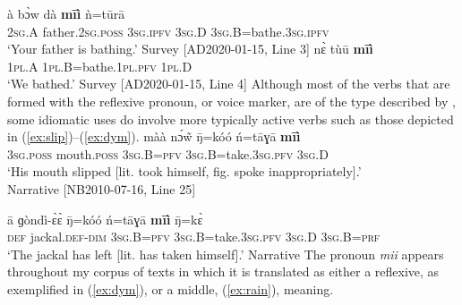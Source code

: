\documentclass[output=paper]{langscibook}
\begin{document}
	\gll à bɔ̀w dà \textbf{mīì} ǹ=tūrā \\
		 2\textsc{sg}.A father.2\textsc{sg}.\textsc{poss} 3\textsc{sg}.\textsc{ipfv} 3\textsc{sg}.D 3\textsc{sg}.B=bathe.3\textsc{sg}.\textsc{ipfv} \\
		\glt `Your father is bathing.' Survey [AD2020-01-15, Line 3]
		\z
	\ea \label{ex:bathe4}
	\gll nɛ̀ tùū \textbf{mīì} \\ 
	1\textsc{pl}.A 1\textsc{pl}.B=bathe.1\textsc{pl}.\textsc{pfv} 1\textsc{pl}.D \\
	\glt `We bathed.' Survey [AD2020-01-15, Line 4]
	\z
Although most of the verbs that are formed with the reflexive pronoun, or voice marker, are of the type described by \cite{Kemmer1994}, some idiomatic uses do involve more typically active verbs such as those depicted in (\ref{ex:slip})--(\ref{ex:dym}).
\ea \label{ex:slip}
\gll màà nɔ́w̃ ŋ̄=kóó ń=tāɣā \textbf{mīì} \\
3\textsc{sg}.\textsc{poss} mouth.\textsc{poss} 3\textsc{sg}.B=\textsc{pfv} 3\textsc{sg}.B=take.3\textsc{sg}.\textsc{pfv} 3\textsc{sg}.D \\
\glt `His mouth slipped [lit. took himself, fig. spoke inappropriately].'\\
Narrative [NB2010-07-16, Line 25]
\z
\ea \label{ex:jackal}

\gll ā ɡòndì-ɛ̀ɛ̀ ŋ̄=kóó ń=tāɣā \textbf{mīì} ŋ̄=kɛ̀ \\
\textsc{def} jackal.\textsc{def}-\textsc{dim} 3\textsc{sg}.B=\textsc{pfv} 3\textsc{sg}.B=take.3\textsc{sg}.\textsc{pfv} 3\textsc{sg}.D 3\textsc{sg}.B=\textsc{prf} \\
\glt `The jackal has left [lit. has taken himself].' Narrative \citep[~401]{HantganDiss}
\z
The pronoun \textit{mii} appears throughout my corpus of texts in which it is translated as either a reflexive, as exemplified in (\ref{ex:dym}), or a middle, (\ref{ex:rain}), meaning.
\ea \label{ex:dym}
\end{document}
